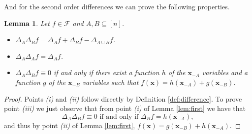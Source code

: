 \documentclass[11pt,a4paper, twoside]{book}
\newtheorem{lemma}{Lemma}[chapter]
\newcommand{\bx}{\mathbf{x}}
\begin{document}
And for the second order differences we can prove the following properties.

\begin{lemma} 
\label{lem:second}
Let $f \in \mathcal{F}$  and $A,B \subseteq [n]$.
\begin{itemize}
\item[(i)] $ \Delta_{A}\Delta_{B} f = \Delta_{A}f  + \Delta_{B}f -\Delta_{A \cup B}f  $.
\item[(ii)] $\Delta_{A}\Delta_{A}f =  \Delta_{A}f$.
\item[(iii)] $\Delta_{A} \Delta_{B}f \equiv 0$ if and only if there exist a function $h$ of the $\bx_{-A}$ variables and a
function $g$ of the $\bx_{-B}$ variables such that $f(\bx) = h(\bx_{-A}) + g(\bx_{-B})$.
\end{itemize}
\end{lemma}

\begin{proof}

Points \textit{(i)} and \textit{(ii)} follow directly by Definition \ref{def:difference}. To prove point \textit{(iii)} we just observe that from point \textit{(i)} of Lemma \ref{lem:first}  we have that
$$ \Delta_{A} \Delta_{B}f \equiv 0 \text{ if and only if } \Delta_{B}f = h(\bx_{-A}),$$
and thus by point \textit{(ii)} of Lemma \ref{lem:first}, $f(\bx) = g(\bx_{-B}) + h(\bx_{-A})$.
\end{proof}
\end{document}
